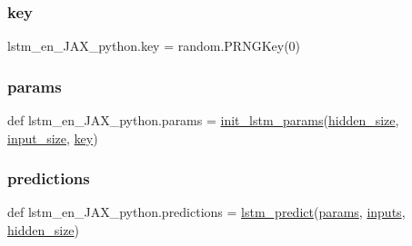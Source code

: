 \subsubsection{\texorpdfstring{key}{key}}
{\footnotesize\ttfamily lstm\+\_\+en\+\_\+\+J\+A\+X\+\_\+python.\+key = random.\+P\+R\+N\+G\+Key(0)}

\mbox{\label{namespacelstm__en__JAX__python_aa48611ad29dd219713a46cc6d4691a76}} 
\subsubsection{\texorpdfstring{params}{params}}
{\footnotesize\ttfamily def lstm\+\_\+en\+\_\+\+J\+A\+X\+\_\+python.\+params = \hyperlink{namespacelstm__en__JAX__python_a0ad26ee1f725cb54ad8b749930e094a8}{init\+\_\+lstm\+\_\+params}(\hyperlink{namespacelstm__en__JAX__python_a43773b878a81b64380dbda3a42dc12ac}{hidden\+\_\+size}, \hyperlink{namespacelstm__en__JAX__python_a105f5427a708a0b2b3eb7ed1e551a956}{input\+\_\+size}, \hyperlink{namespacelstm__en__JAX__python_a69d278272de0d7f417fa3a912d7942c1}{key})}

\mbox{\label{namespacelstm__en__JAX__python_a3257f5a4a3e7a7fedaa56d2daf78c405}} 
\subsubsection{\texorpdfstring{predictions}{predictions}}
{\footnotesize\ttfamily def lstm\+\_\+en\+\_\+\+J\+A\+X\+\_\+python.\+predictions = \hyperlink{namespacelstm__en__JAX__python_a11bf77a2c3fc11105d4d29944e565986}{lstm\+\_\+predict}(\hyperlink{namespacelstm__en__JAX__python_aa48611ad29dd219713a46cc6d4691a76}{params}, \hyperlink{namespacelstm__en__JAX__python_a2e0078d9d0b56fa8efb5e5e7f1a6fb1c}{inputs}, \hyperlink{namespacelstm__en__JAX__python_a43773b878a81b64380dbda3a42dc12ac}{hidden\+\_\+size})}

